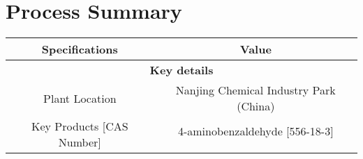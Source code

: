 \section{Process Summary}
\label{app:processsummary}
\begin{table}[]
\begin{tabular}{|c|c|c|}
\hline
\multicolumn{2}{|c|}{\textbf{Specifications}}                              & \textbf{Value}                                                                                                                                                                                                                                                                                                                                                                                                                          \\ \hline
\multicolumn{3}{|c|}{\textbf{Key details}}                                                                                                                                                                                                                                                                                                                                                                                                                                                                           \\ \hline
\multicolumn{2}{|c|}{Plant Location}                                       & Nanjing Chemical Industry Park (China)                                                                                                                                                                                                                                                                                                                                                                                                  \\ \hline
\multicolumn{2}{|c|}{\multirow{3}{*}{Key Products {[}CAS Number{]}}}       & 4-aminobenzaldehyde {[}556-18-3{]}                                                                                                                                                                                                                                                                                                                                                                                                      \\ \cline{3-3} 

\end{tabular}
\end{table}
